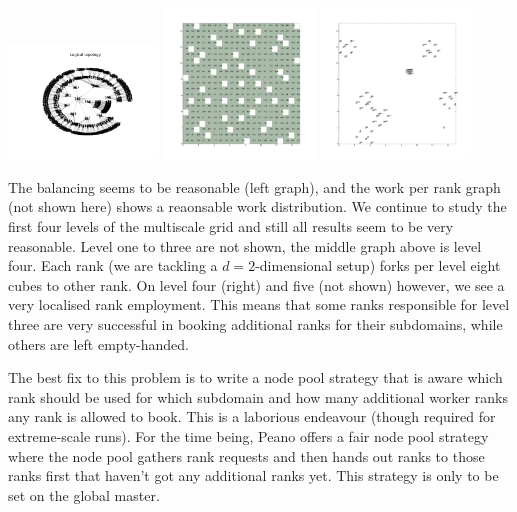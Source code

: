 \begin{center}
  \includegraphics[width=0.3\textwidth]{62_quick-tuning/rank-races.pdf}
  \includegraphics[width=0.3\textwidth]{62_quick-tuning/rank-races-level4.pdf}
  \includegraphics[width=0.3\textwidth]{62_quick-tuning/rank-races-level5.pdf}
\end{center}

\noindent
The balancing seems to be reasonable (left graph), and the work per rank
graph (not shown here) shows a reaonsable work distribution.
We continue to study the first four levels of the multiscale grid 
and still all results seem to be very reasonable. 
Level one to three are not shown, the middle graph above is level four.
Each rank (we are tackling a $d=2$-dimensional setup) forks per level eight
cubes to other rank.
On level four (right) and five (not shown) however, we see a very localised rank
employment.
This means that some ranks responsible for level three are very successful in
booking additional ranks for their subdomains, while others are left
empty-handed.

The best fix to this problem is to write a node pool strategy that is aware
which rank should be used for which subdomain and how many additional
worker ranks any rank is allowed to book.
This is a laborious endeavour (though required for extreme-scale runs). 
For the time being, Peano offers a fair node pool strategy where the node pool
gathers rank requests and then hands out ranks to those ranks first that haven't
got any additional ranks yet.
This strategy is only to be set on the global master.

